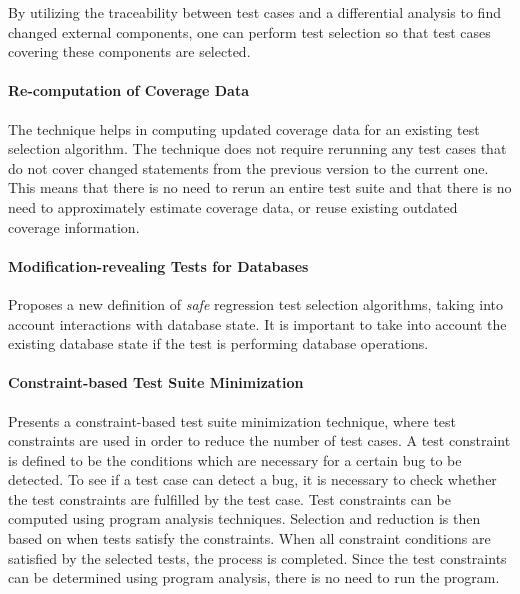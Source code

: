 \documentclass[a4paper,english,12pt]{report}
\begin{document}
By utilizing the traceability between test cases and a differential analysis to find changed external components, one can perform test selection so that test cases covering these components are selected. \citep{nanda2011regression}

\paragraph{Re-computation of Coverage Data \citep{chittimalli2009recomputing}}
The technique helps in computing updated coverage data for an existing test selection algorithm. The technique does not require rerunning any test cases that do not cover changed statements from the previous version to the current one. This means that there is no need to rerun an entire test suite and that there is no need to approximately estimate coverage data, or reuse existing outdated coverage information. \citep{chittimalli2009recomputing}

\paragraph{Modification-revealing Tests for Databases \citep{willmor2005safe}}
Proposes a new definition of \textit{safe} regression test selection algorithms, taking into account interactions with database state. It is important to take into account the existing database state if the test is performing database operations. \citep{willmor2005safe}

\paragraph{Constraint-based Test Suite Minimization \citep{sun2011constraint}}
Presents a constraint-based test suite minimization technique, where test constraints are used in order to reduce the number of test cases. A test constraint is defined to be the conditions which are necessary for a certain bug to be detected. To see if a test case can detect a bug, it is necessary to check whether the test constraints are fulfilled by the test case. Test constraints can be computed using program analysis techniques. Selection and reduction is then based on when tests satisfy the constraints. When all constraint conditions are satisfied by the selected tests, the process is completed. Since the test constraints can be determined using program analysis, there is no need to run the program. \citep{sun2011constraint}
\end{document}
